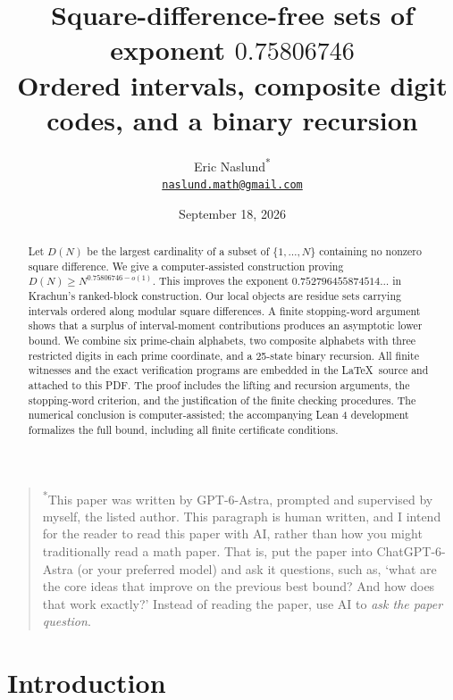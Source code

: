 \documentclass[11pt]{article}
\title{Square-difference-free sets of exponent \texorpdfstring{$0.75806746$}{0.75806746}\\[3pt]\large Ordered intervals, composite digit codes, and a binary recursion}
\author{Eric Naslund\textsuperscript{*}\\[3pt]
\normalsize\href{mailto:naslund.math@gmail.com}{\texttt{naslund.math@gmail.com}}}
\date{September 18, 2026}
\theoremstyle{definition}
\theoremstyle{remark}
\begin{document}
\maketitle
\begin{quote}
\small\noindent\textsuperscript{*}This paper was written by GPT-6-Astra, prompted and supervised by myself, the listed author.
This paragraph is human written, and I intend for the reader to read this paper with AI, rather than how you might traditionally read a math paper.
That is, put the paper into ChatGPT-6-Astra (or your preferred model) and ask it questions, such as, `what are the core ideas that improve on the previous best bound? And how does that work exactly?'
Instead of reading the paper, use AI to \emph{ask the paper question}.
\end{quote}
\begin{abstract}
Let $D(N)$ be the largest cardinality of a subset of $\{1,\ldots,N\}$
containing no nonzero square difference. We give a computer-assisted construction
proving $D(N)\ge N^{0.75806746-o(1)}$. This improves the exponent
$0.752796455874514\ldots$ in Krachun's ranked-block construction.
Our local objects are residue sets carrying intervals ordered along modular
square differences. A finite stopping-word argument shows that a surplus of
interval-moment contributions produces an asymptotic lower bound.
We combine six prime-chain alphabets, two composite alphabets with three
restricted digits in each prime coordinate, and a 25-state binary recursion.
All finite witnesses and the exact verification programs are embedded in the
\LaTeX\ source and attached to this PDF. The proof includes the lifting and
recursion arguments, the stopping-word criterion, and the justification of
the finite checking procedures. The numerical conclusion is computer-assisted;
the accompanying Lean 4 development formalizes the full bound, including all
finite certificate conditions.
\end{abstract}
\clearpage
\setcounter{tocdepth}{1}
\tableofcontents
\clearpage

\section{Introduction}
\end{document}
